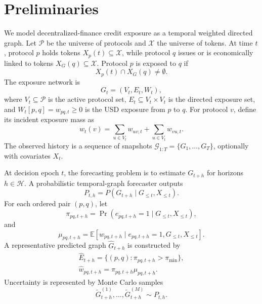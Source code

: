 \section{Preliminaries}
\label{sec:preliminaries}

We model decentralized-finance credit exposure as a temporal weighted directed graph. Let $\mathcal{P}$ be the universe of protocols and $\mathcal{X}$ the universe of tokens. At time $t$, protocol $p$ holds tokens $X_p(t)\subseteq\mathcal{X}$, while protocol $q$ issues or is economically linked to tokens $X_G(q)\subseteq\mathcal{X}$. Protocol $p$ is exposed to $q$ if
\begin{equation}
X_p(t)\cap X_G(q)\neq\emptyset .
\end{equation}
The exposure network is
\begin{equation}
G_t=(V_t,E_t,W_t),
\end{equation}
where $V_t\subseteq\mathcal{P}$ is the active protocol set, $E_t\subseteq V_t\times V_t$ is the directed exposure set, and $W_t[p,q]=w_{pq,t}\geq 0$ is the USD exposure from $p$ to $q$. For protocol $v$, define its incident exposure mass as
\begin{equation}
w_t(v)=\sum_{u\in V_t}w_{uv,t}+\sum_{u\in V_t}w_{vu,t}.
\end{equation}
The observed history is a sequence of snapshots $\mathcal{G}_{1:T}=\{G_1,\ldots,G_T\}$, optionally with covariates $X_t$.

At decision epoch $t$, the forecasting problem is to estimate $G_{t+h}$ for horizons $h\in\mathcal{H}$. A probabilistic temporal-graph forecaster outputs
\begin{equation}
P_{t,h}=P(G_{t+h}\mid G_{\leq t},X_{\leq t}).
\end{equation}
For each ordered pair $(p,q)$, let
\begin{equation}
\pi_{pq,t+h}=\Pr(e_{pq,t+h}=1\mid G_{\leq t},X_{\leq t}),
\end{equation}
and
\begin{equation}
\mu_{pq,t+h}
=
\mathbb{E}\!\left[
w_{pq,t+h}
\mid
e_{pq,t+h}=1,G_{\leq t},X_{\leq t}
\right].
\end{equation}
A representative predicted graph $\widehat{G}_{t+h}$ is constructed by
\begin{gather*}
\widehat{E}_{t+h}
=
\{(p,q):\pi_{pq,t+h}>\pi_{\min}\},\\
\widehat{w}_{pq,t+h}
=
\pi_{pq,t+h}\mu_{pq,t+h}.
\end{gather*}
Uncertainty is represented by Monte Carlo samples
\begin{equation}
\widetilde{G}_{t+h}^{(1)},\ldots,\widetilde{G}_{t+h}^{(M)}
\sim P_{t,h}.
\end{equation}

